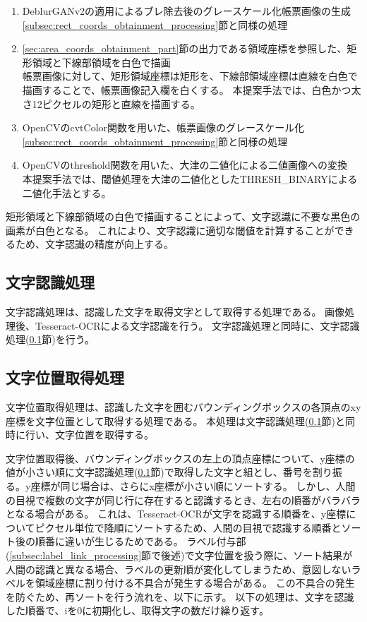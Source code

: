 \begin{enumerate}
    \item DeblurGANv2の適用によるブレ除去後のグレースケール化帳票画像の生成\\
        \ref{subsec:rect_coords_obtainment_processing}節と同様の処理
    \item \ref{sec:area_coords_obtainment_part}節の出力である領域座標を参照した、矩形領域と下線部領域を白色で描画\\
        帳票画像に対して、矩形領域座標は矩形を、下線部領域座標は直線を白色で描画することで、帳票画像記入欄を白くする。
        本提案手法では、白色かつ太さ12ピクセルの矩形と直線を描画する。
    \item OpenCVのcvtColor関数を用いた、帳票画像のグレースケール化\\
        \ref{subsec:rect_coords_obtainment_processing}節と同様の処理
    \item OpenCVのthreshold関数を用いた、大津の二値化による二値画像への変換\\
        本提案手法では、閾値処理を大津の二値化としたTHRESH\_BINARYによる二値化手法とする。
\end{enumerate}

矩形領域と下線部領域の白色で描画することによって、文字認識に不要な黒色の画素が白色となる。
これにより、文字認識に適切な閾値を計算することができるため、文字認識の精度が向上する。

\subsection{文字認識処理}\label{subsec:char_recognition_processing}
文字認識処理は、認識した文字を取得文字として取得する処理である。
画像処理後、Tesseract-OCRによる文字認識を行う。
文字認識処理と同時に、文字認識処理(\ref{subsec:char_recognition_processing}節)を行う。


\subsection{文字位置取得処理}\label{subsec:char_position_obtainment_processing}
文字位置取得処理は、認識した文字を囲むバウンディングボックスの各頂点のxy座標を文字位置として取得する処理である。
本処理は文字認識処理(\ref{subsec:char_recognition_processing}節)と同時に行い、文字位置を取得する。

文字位置取得後、バウンディングボックスの左上の頂点座標について、y座標の値が小さい順に文字認識処理(\ref{subsec:char_recognition_processing}節)で取得した文字と組とし、番号を割り振る。y座標が同じ場合は、さらにx座標が小さい順にソートする。
しかし、人間の目視で複数の文字が同じ行に存在すると認識するとき、左右の順番がバラバラとなる場合がある。
これは、Tesseract-OCRが文字を認識する順番を、y座標についてピクセル単位で降順にソートするため、人間の目視で認識する順番とソート後の順番に違いが生じるためである。
ラベル付与部(\ref{subsec:label_link_processing}節で後述)で文字位置を扱う際に、ソート結果が人間の認識と異なる場合、ラベルの更新順が変化してしまうため、意図しないラベルを領域座標に割り付ける不具合が発生する場合がある。
この不具合の発生を防ぐため、再ソートを行う流れを、以下に示す。
以下の処理は、文字を認識した順番で、iを0に初期化し、取得文字の数だけ繰り返す。

